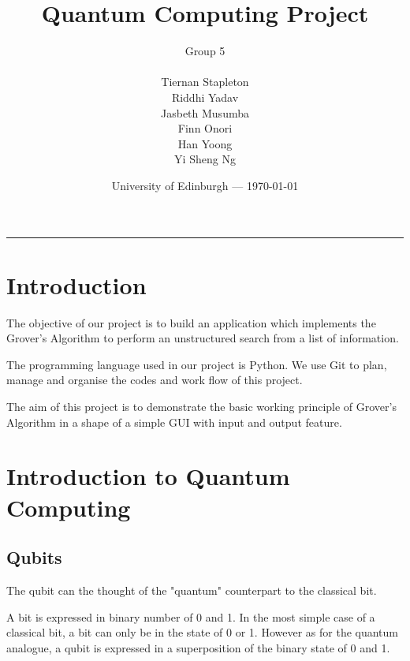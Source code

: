 \documentclass{article}
\title{Quantum Computing Project} %
\author{Group 5 \\ \\ Tiernan Stapleton\\ Riddhi Yadav\\ Jasbeth Musumba \\ Finn Onori \\ Han Yoong  \\ Yi Sheng Ng}  %
\date{University of Edinburgh --- \today} %
\begin{document}
\maketitle %

\vspace{10mm}
\hrule

\vspace{10mm}

\section*{Introduction} %
\vspace{10mm}

The objective of our project is to build an application which implements the Grover's Algorithm to perform an unstructured search from a list of information. 
\vspace{5mm}

The programming language used in our project is Python. We use Git to plan, manage and organise the codes and work flow of this project. 
\vspace{5mm}

The aim of this project is to demonstrate the basic working principle of Grover's Algorithm in a shape of a simple GUI with input and output feature.
\pagebreak

\tableofcontents %
\pagebreak

\section{Introduction to Quantum Computing}
\vspace{5mm}

\subsection{Qubits}
\vspace{5mm}

The qubit can the thought of the "quantum" counterpart to the classical bit. 
\vspace{5mm}

\noindent
A bit is expressed in binary number of 0 and 1. In the most simple case of a classical bit, a bit can only be in the state of 0 or 1. However as for the quantum analogue, a qubit is expressed in a superposition of the binary state of 0 and 1.
\vspace{5mm}
\end{document}

